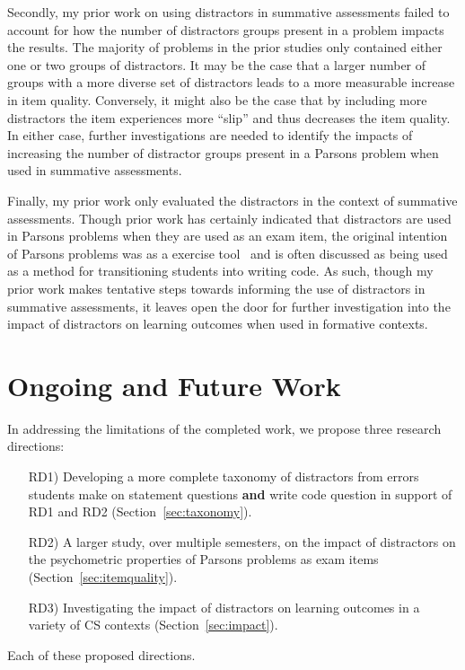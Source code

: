 \documentclass[authorversion,nonacm]{acmart}
\begin{document}
Secondly, my prior work on using distractors in summative assessments 
failed to account for how the number of distractors groups present in a problem
impacts the results. The majority of problems in the prior studies only
contained either one or two groups of distractors. It may be the case that
a larger number of groups with a more diverse set of distractors leads to 
a more measurable increase in item quality. Conversely, it might also be the
case that by including more distractors the item experiences more ``slip'' 
and thus decreases the item quality. In either case, further investigations
are needed to identify the impacts of increasing the number of distractor 
groups present in a Parsons problem when used in summative assessments.


Finally, my prior work only evaluated the distractors in the context of
summative assessments. Though prior work has certainly indicated that
distractors are used in Parsons problems when they are used as an exam item,
the original intention of Parsons problems was as a exercise
tool~\cite{parsons2006parson} and is often discussed as being used as a method
for transitioning students into writing code. As such, though my prior work
makes tentative steps towards informing the use of distractors in summative
assessments, it leaves open the door for further investigation into the impact
of distractors on learning outcomes when used in formative contexts.

\section{Ongoing and Future Work}

In addressing the limitations of the completed work, we propose three research
directions:
\begin{enumerate}
  \item[RD1)] Developing a more complete taxonomy of distractors from errors
    students make on statement questions \textbf{and} write code question in support of
    RD1 and RD2 (Section~\ref{sec:taxonomy}).
  \item[RD2)] A larger study, over multiple semesters, on the impact of distractors on the psychometric
    properties of Parsons problems as exam items (Section~\ref{sec:itemquality}).
  \item[RD3)] Investigating the impact of distractors on learning outcomes in a
    variety of CS contexts (Section~\ref{sec:impact}).
\end{enumerate}
Each of these proposed directions. 
\end{document}
